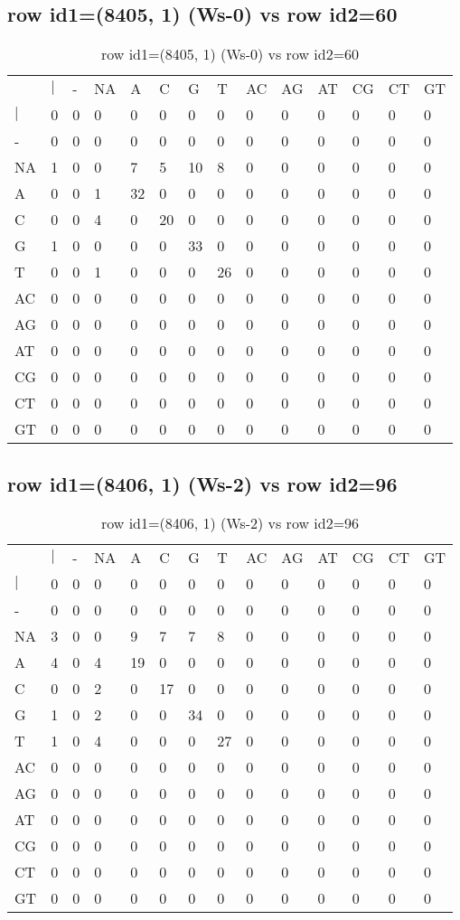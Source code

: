 \subsection{row id1=(8405, 1) (Ws-0) vs row id2=60}
\begin{center}
\begin{longtable}{|l|l|l|l|l|l|l|l|l|l|l|l|l|l|}
\caption{row id1=(8405, 1) (Ws-0) vs row id2=60} \label{table_dm672}\\
\hline
\\
\hline
&$|$&-&NA&A&C&G&T&AC&AG&AT&CG&CT&GT\\
$|$&0&0&0&0&0&0&0&0&0&0&0&0&0\\
-&0&0&0&0&0&0&0&0&0&0&0&0&0\\
NA&1&0&0&7&5&10&8&0&0&0&0&0&0\\
A&0&0&1&32&0&0&0&0&0&0&0&0&0\\
C&0&0&4&0&20&0&0&0&0&0&0&0&0\\
G&1&0&0&0&0&33&0&0&0&0&0&0&0\\
T&0&0&1&0&0&0&26&0&0&0&0&0&0\\
AC&0&0&0&0&0&0&0&0&0&0&0&0&0\\
AG&0&0&0&0&0&0&0&0&0&0&0&0&0\\
AT&0&0&0&0&0&0&0&0&0&0&0&0&0\\
CG&0&0&0&0&0&0&0&0&0&0&0&0&0\\
CT&0&0&0&0&0&0&0&0&0&0&0&0&0\\
GT&0&0&0&0&0&0&0&0&0&0&0&0&0\\
\hline
\end{longtable}
\end{center}

\subsection{row id1=(8406, 1) (Ws-2) vs row id2=96}
\begin{center}
\begin{longtable}{|l|l|l|l|l|l|l|l|l|l|l|l|l|l|}
\caption{row id1=(8406, 1) (Ws-2) vs row id2=96} \label{table_dm674}\\
\hline
\\
\hline
&$|$&-&NA&A&C&G&T&AC&AG&AT&CG&CT&GT\\
$|$&0&0&0&0&0&0&0&0&0&0&0&0&0\\
-&0&0&0&0&0&0&0&0&0&0&0&0&0\\
NA&3&0&0&9&7&7&8&0&0&0&0&0&0\\
A&4&0&4&19&0&0&0&0&0&0&0&0&0\\
C&0&0&2&0&17&0&0&0&0&0&0&0&0\\
G&1&0&2&0&0&34&0&0&0&0&0&0&0\\
T&1&0&4&0&0&0&27&0&0&0&0&0&0\\
AC&0&0&0&0&0&0&0&0&0&0&0&0&0\\
AG&0&0&0&0&0&0&0&0&0&0&0&0&0\\
AT&0&0&0&0&0&0&0&0&0&0&0&0&0\\
CG&0&0&0&0&0&0&0&0&0&0&0&0&0\\
CT&0&0&0&0&0&0&0&0&0&0&0&0&0\\
GT&0&0&0&0&0&0&0&0&0&0&0&0&0\\
\hline
\end{longtable}
\end{center}

